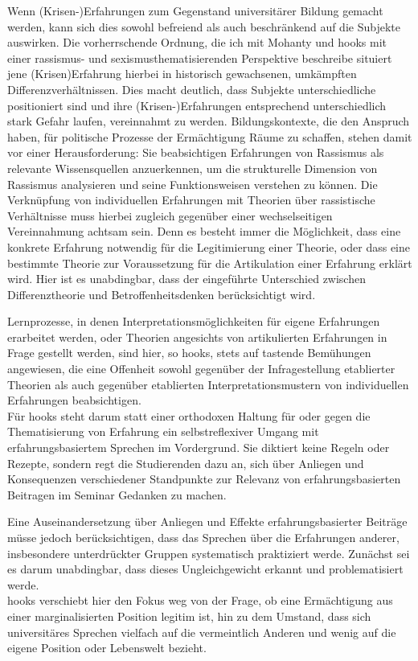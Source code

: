 Wenn (Krisen-)Erfahrungen zum Gegenstand universitärer Bildung gemacht werden,
kann sich dies sowohl befreiend als auch beschränkend auf die Subjekte
auswirken. Die vorherrschende Ordnung, die ich mit Mohanty und hooks mit einer
rassismus- und sexismusthematisierenden Perspektive beschreibe situiert jene
(Krisen)Erfahrung hierbei in historisch gewachsenen, umkämpften
Differenzverhältnissen. Dies macht deutlich, dass Subjekte unterschiedliche
positioniert sind und ihre (Krisen-)Erfahrungen entsprechend unterschiedlich
stark Gefahr laufen, vereinnahmt zu werden. Bildungskontexte, die den Anspruch
haben, für politische Prozesse der Ermächtigung Räume zu schaffen, stehen damit
vor einer Herausforderung: Sie beabsichtigen Erfahrungen von Rassismus als
relevante Wissensquellen anzuerkennen, um die strukturelle Dimension von
Rassismus analysieren und seine Funktionsweisen verstehen zu können. Die
Verknüpfung von individuellen Erfahrungen mit Theorien über rassistische
Verhältnisse muss hierbei zugleich gegenüber einer wechselseitigen
Vereinnahmung achtsam sein. Denn es besteht immer die Möglichkeit, dass eine
konkrete Erfahrung notwendig für die Legitimierung einer Theorie, oder dass
eine bestimmte Theorie zur Voraussetzung für die Artikulation einer Erfahrung
erklärt wird. Hier ist es unabdingbar, dass der eingeführte Unterschied
zwischen Differenztheorie und Betroffenheitsdenken berücksichtigt wird.

Lernprozesse, in denen Interpretationsmöglichkeiten für eigene Erfahrungen
erarbeitet werden, oder Theorien angesichts von artikulierten Erfahrungen in
Frage gestellt werden, sind hier, so hooks,  stets auf tastende Bemühungen
angewiesen, die eine Offenheit sowohl gegenüber der Infragestellung etablierter
Theorien als auch gegenüber etablierten Interpretationsmustern von
individuellen Erfahrungen beabsichtigen.\footnotemark{}
\\

Für hooks steht darum statt einer orthodoxen Haltung für oder gegen die
Thematisierung von Erfahrung ein selbstreflexiver Umgang mit
erfahrungsbasiertem Sprechen im Vordergrund. Sie diktiert keine Regeln oder
Rezepte, sondern regt die Studierenden dazu an, sich über Anliegen und
Konsequenzen verschiedener Standpunkte zur Relevanz von erfahrungsbasierten
Beitragen im Seminar Gedanken zu machen. 

Eine Auseinandersetzung über Anliegen
und Effekte erfahrungsbasierter Beiträge müsse jedoch berücksichtigen, dass das
Sprechen über die Erfahrungen anderer, insbesondere unterdrückter Gruppen
systematisch praktiziert werde. Zunächst sei es darum unabdingbar, dass dieses
Ungleichgewicht erkannt und problematisiert werde.\footnotemark{}\\
 hooks verschiebt hier den
Fokus weg von der Frage, ob eine Ermächtigung aus einer marginalisierten
Position legitim ist, hin zu dem Umstand, dass sich universitäres Sprechen
vielfach auf die vermeintlich Anderen und wenig auf die eigene Position oder
Lebenswelt bezieht. 

